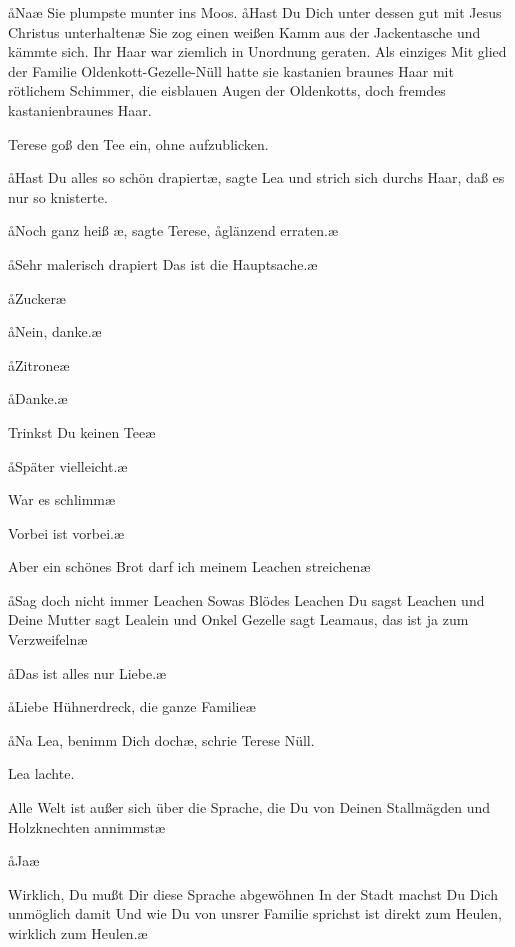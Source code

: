 \aa Na\frag\ae{} Sie plumpste munter ins Moos. \aa Hast Du Dich unter\-%
dessen gut mit Jesus Christus unterhalten\frag\ae{} Sie zog einen
weißen Kamm aus der Jackentasche und kämmte sich. Ihr
Haar war ziemlich in Unordnung geraten. Als einziges Mit\-%
glied der Familie Oldenkott-Gezelle-Nüll hatte sie kastanien\-%
braunes Haar mit rötlichem Schimmer, die eisblauen Augen
der Oldenkotts, doch fremdes kastanienbraunes Haar.

Terese goß den Tee ein, ohne aufzublicken.

\aa Hast Du alles so schön drapiert\frag\ae, sagte Lea und strich sich
durchs Haar, daß es nur so knisterte.

\aa Noch ganz heiß%
\eingriff{heiß\ae, sagte ] heiß,\ae{} sagte}\ae,
sagte Terese, \aa glänzend erraten.\ae

\aa Sehr malerisch drapiert\ausr{} Das ist die Hauptsache.\ae

\aa Zucker\frag\ae

\aa Nein, danke.\ae

\aa Zitrone\frag\ae

\aa Danke.\ae

\aanah Trinkst Du keinen Tee\frag\ae

\aa Später vielleicht.\ae

\aanah War es schlimm\frag\ae

\aanah Vorbei ist vorbei.\ae

\aanah Aber ein schönes Brot darf ich meinem Leachen streichen\frag\ae

\aa Sag doch nicht immer Leachen\ausr{} Sowas Blödes\ausr{} Leachen\ausr{}
Du sagst Leachen und Deine Mutter sagt Lealein und Onkel
Gezelle sagt Leamaus, das ist ja zum Verzweifeln\ausr\ae

\aa Das ist alles nur Liebe.\ae

\aa Liebe\ausr{} Hühnerdreck, die ganze Familie\ausr\ae

\aa Na Lea, benimm Dich doch\ae, schrie Terese Nüll.

Lea lachte.

\aanah Alle Welt ist außer sich über die Sprache, die Du von Deinen
Stallmägden und Holzknechten annimmst\ausr\ae

\aa Ja\frag\ae

\aanah Wirklich, Du mußt Dir diese Sprache abgewöhnen\ausr{} In der
Stadt machst Du Dich unmöglich damit\ausr{} Und wie Du von
unsrer Familie sprichst ist direkt zum Heulen, wirklich zum
Heulen.\ae

